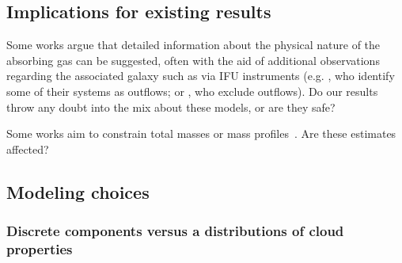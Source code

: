 \documentclass[fleqn,usenatbib]{mnras}
\begin{document}
\subsection{Implications for existing results}

Some works argue that detailed information about the physical nature of the absorbing gas can be suggested, often with the aid of additional observations regarding the associated galaxy such as via IFU instruments (e.g. \citealt{Peroux2013}, who identify some of their systems as outflows; or \citealt{Peroux2017}, who exclude outflows).
Do our results throw any doubt into the mix about these models, or are they safe?

Some works aim to constrain total masses or mass profiles~\citep[e.g.][]{Zahedy2019a}.
Are these estimates affected?

\subsection{Modeling choices}

\subsubsection{Discrete components versus a distributions of cloud properties}
\end{document}

